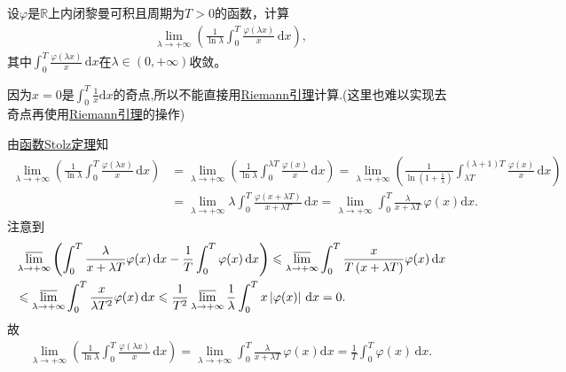 \documentclass[../../main.tex]{subfiles}%
\begin{document}
\begin{example}
设\(\varphi\)是\(\mathbb{R}\)上内闭黎曼可积且周期为\(T > 0\)的函数，计算
\begin{align*}
\lim_{\lambda \to +\infty} \left( \frac{1}{\ln \lambda} \int_0^T \frac{\varphi(\lambda x)}{x} \, \mathrm{d}x \right),
\end{align*}
其中\(\int_0^T \frac{\varphi(\lambda x)}{x} \, \mathrm{d}x\)在\(\lambda \in (0, +\infty)\)收敛。
\end{example}
\begin{remark}
因为$x=0$是$\int_0^T{\frac{1}{x}\mathrm{d}x}$的奇点,所以不能直接用\hyperref[theorem:Riemann引理]{Riemann引理}计算.(这里也难以实现去奇点再使用\hyperref[theorem:Riemann引理]{Riemann引理}的操作)
\end{remark}
\begin{solution}
由\hyperref[theorem:函数Stolz定理]{函数Stolz定理}知
\begin{align*}
\lim_{\lambda \rightarrow +\infty} \left( \frac{1}{\ln \lambda}\int_0^T{\frac{\varphi (\lambda x)}{x}\,\mathrm{d}x} \right) &=\lim_{\lambda \rightarrow +\infty} \left( \frac{1}{\ln \lambda}\int_0^{\lambda T}{\frac{\varphi (x)}{x}\,\mathrm{d}x} \right) =\lim_{\lambda \rightarrow +\infty} \left( \frac{1}{\ln \left( 1+\frac{1}{\lambda} \right)}\int_{\lambda T}^{\left( \lambda +1 \right) T}{\frac{\varphi (x)}{x}\,\mathrm{d}x} \right) \\
&=\lim_{\lambda \rightarrow +\infty} \lambda \int_0^T{\frac{\varphi (x+\lambda T)}{x+\lambda T}\,\mathrm{d}x} =\lim_{\lambda \rightarrow +\infty} \int_0^T{\frac{\lambda}{x+\lambda T}\,\varphi (x)\mathrm{d}x}.
\end{align*}
注意到
\begin{align*}
&\varlimsup_{\lambda \rightarrow +\infty}\left( \int_0^T{\frac{\lambda}{x+\lambda T}\varphi (x)\,\mathrm{d}x}-\frac{1}{T}\int_0^T{\varphi (x)\,\mathrm{d}x} \right) \leqslant \varlimsup_{\lambda \rightarrow +\infty}\int_0^T{\frac{x}{T\left( x+\lambda T \right)}\varphi (x)\,\mathrm{d}x} \\
&\leqslant \varlimsup_{\lambda \rightarrow +\infty}\int_0^T{\frac{x}{\lambda T^2}\varphi (x)\,\mathrm{d}x} \leqslant \frac{1}{T^2}\varlimsup_{\lambda \rightarrow +\infty}\frac{1}{\lambda}\int_0^T{x\left| \varphi (x) \right|\,\mathrm{d}x}=0.
\end{align*}
故
\begin{align*}
\lim_{\lambda \rightarrow +\infty} \left( \frac{1}{\ln \lambda}\int_0^T{\frac{\varphi (\lambda x)}{x}\,\mathrm{d}x} \right) =\lim_{\lambda \rightarrow +\infty} \int_0^T{\frac{\lambda}{x+\lambda T}\,\varphi (x)\mathrm{d}x}=\frac{1}{T}\int_0^T{\varphi (x)\,\mathrm{d}x}.
\end{align*}
\end{solution}
\end{document}
